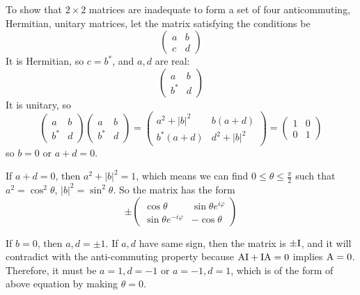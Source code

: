 \documentclass[a4paper]{article}
\begin{document}
To show that $2\times2$ matrices are inadequate to form a set of four anticommuting, Hermitian,
unitary matrices, let the matrix satisfying the conditions be 
\[
\begin{pmatrix}
a&b\\c&d
\end{pmatrix}
\]
It is Hermitian, so $c=b^*$, and $a,d$ are real:
\[
\begin{pmatrix}
a&b\\b^*&d
\end{pmatrix}
\]
It is unitary, so
\[
\begin{pmatrix}
a&b\\b^*&d
\end{pmatrix}
\begin{pmatrix}
a&b\\b^*&d
\end{pmatrix}=\begin{pmatrix}
a^2+|b|^2&b(a+d)\\
b^*(a+d)&d^2+|b|^2
\end{pmatrix}=
\begin{pmatrix}
1&0\\0&1
\end{pmatrix}
\]
so $b=0$ or $a+d=0$. 

If $a+d=0$, then $a^2+|b|^2=1$, which means we can find $0\leq\theta\leq\frac{\pi}{2}$ such that $a^2=\cos^2\theta$, $|b|^2=\sin^2\theta$. So the matrix has the form
\[\pm
\begin{pmatrix}
\cos\theta&\sin\theta e^{i\varphi}\\
\sin\theta e^{-i\varphi}& -\cos\theta
\end{pmatrix}
\]

If $b=0$, then $a,d=\pm1$. If $a,d$ have same sign, then the matrix is $\pm\mathrm{I}$, and it will contradict with the anti-commuting property because $\mathrm{A}\mathrm{I}+\mathrm{I}\mathrm{A}=0$ implies $\mathrm{A}=0$. Therefore, it must be $a=1,d=-1$ or $a=-1,d=1$, which is of the form of above equation by making $\theta=0$. 
\end{document}
